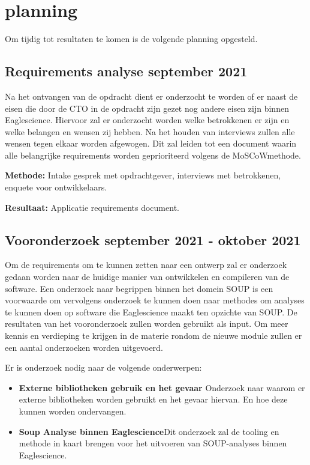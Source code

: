 \section{planning}\label{sec:planning}
Om tijdig tot resultaten te komen is de volgende planning opgesteld.

\subsection{Requirements analyse \textbf{september 2021}}\label{subsec:requirements-analyse}
Na het ontvangen van de opdracht dient er onderzocht te worden of er naast de eisen die door de CTO in de opdracht zijn gezet nog andere eisen zijn binnen Eaglescience. Hiervoor zal er onderzocht worden welke betrokkenen er zijn en welke belangen en wensen zij hebben. Na het houden van interviews zullen alle wensen tegen elkaar worden afgewogen. Dit zal leiden tot een document waarin alle belangrijke requirements worden geprioriteerd volgens de MoSCoW\-methode.

\textbf{Methode:} Intake gesprek met opdrachtgever, interviews met betrokkenen, enquete voor ontwikkelaars.

\textbf{Resultaat:} Applicatie requirements document.

\subsection{Vooronderzoek \textbf{september 2021 - oktober 2021 }}\label{subsec:onderzoek}
Om de requirements om te kunnen zetten naar een ontwerp zal er onderzoek gedaan worden naar de huidige manier van ontwikkelen en compileren van de software. Een onderzoek naar begrippen binnen het domein SOUP is een voorwaarde om vervolgens onderzoek te kunnen doen naar methodes om analyses te kunnen doen op software die Eaglescience maakt ten opzichte van SOUP. De resultaten van het vooronderzoek zullen worden gebruikt als input.
Om meer kennis en verdieping te krijgen in de materie rondom de nieuwe module zullen er een aantal onderzoeken worden uitgevoerd.


Er is onderzoek nodig naar de volgende onderwerpen:
\begin{itemize}
    \item \textbf{Externe bibliotheken gebruik en het gevaar} Onderzoek naar waarom er externe bibliotheken worden gebruikt en het gevaar hiervan. En hoe deze kunnen worden ondervangen.
    \item \textbf{Soup Analyse binnen Eaglescience}Dit onderzoek zal de tooling en methode in kaart brengen voor het uitvoeren van SOUP-analyses binnen Eaglescience.
\end{itemize}


